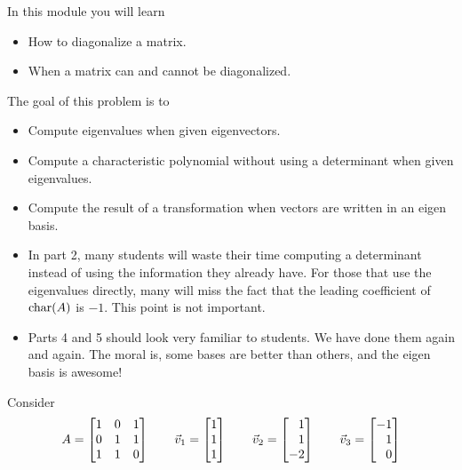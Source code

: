 \documentclass{problemset}
\newcommand{\bookonlynewpage}{\begin{bookonly}\newpage\end{bookonly}}
\begin{document}
\begin{module}

	In this module you will learn
	\begin{itemize}
		\item How to diagonalize a matrix.
		\item When a matrix can and cannot be diagonalized.
	\end{itemize}

	
\end{module}
	\bookonlynewpage
	\question
	\label{actingOnEigenvectors}
	\begin{annotation}
		\begin{goals}

			The goal of this problem is to
			\begin{itemize}
				\item Compute eigenvalues when given eigenvectors.
				\item Compute a characteristic polynomial without using a determinant
					when given eigenvalues.
				\item Compute the result of a transformation when vectors are written in an eigen basis.
			\end{itemize}
		\end{goals}

		\begin{notes}
			\begin{itemize}
				\item In part 2, many students will waste their time computing a determinant instead
					of using the information they already have. For those that use the eigenvalues
					directly, many will miss the fact that the leading coefficient of $\operatorname{char}(A)$ is $-1$.
					This point is not important.
				\item Parts 4 and 5 should look very familiar to students. We have done them again and again.
					The moral is, some bases are better than others, and the eigen basis is awesome!
			\end{itemize}
		\end{notes}
	\end{annotation}
	Consider
	\[
		A=\mat{1&0&1\\0&1&1\\1&1&0}\qquad
		\vec v_1=\mat{1\\1\\1}\qquad
		\vec v_2=\mat{1\\1\\-2}\qquad
		\vec v_3=\mat{-1\\1\\0}
	\]
\end{document}

